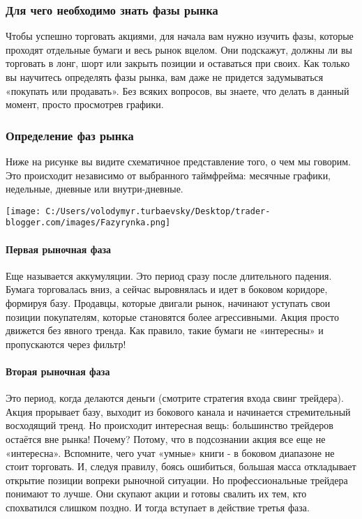 \documentclass[a5paper]{article}
\begin{document}
\subsubsection{Для чего необходимо знать фазы рынка}

Чтобы успешно торговать акциями, для начала вам нужно изучить фазы, которые проходят отдельные бумаги и весь рынок вцелом. Они подскажут, должны ли вы торговать в лонг, шорт или закрыть позиции и оставаться при своих. Как только вы научитесь определять фазы рынка, вам даже не придется задумываться «покупать или продавать». Без всяких вопросов, вы знаете, что делать в данный момент, просто просмотрев графики.

\subsubsection{ Определение фаз рынка}

Ниже на рисунке вы видите схематичное представление того, о чем мы говорим. Это происходит независимо от выбранного таймфрейма: месячные графики, недельные, дневные или внутри-дневные.

\texttt{[image: C:/Users/volodymyr.turbaevsky/Desktop/trader-blogger.com/images/Fazyrynka.png]}

\paragraph{Первая рыночная фаза}

Еще называется аккумуляции. Это период сразу после длительного
падения. Бумага торговалась вниз, а сейчас выровнялась и идет в
боковом коридоре, формируя базу. Продавцы, которые двигали рынок,
начинают уступать свои позиции покупателям, которые становятся более
агрессивными. Акция просто движется без явного тренда. Как правило,
такие бумаги не «интересны»  и пропускаются через фильтр!

\paragraph{Вторая рыночная фаза}

Это период, когда делаются деньги (смотрите стратегия входа свинг
трейдера). Акция прорывает базу, выходит из бокового канала и
начинается стремительный восходящий тренд. Но происходит интересная
вещь: большинство трейдеров остаётся вне рынка! Почему? Потому, что в
подсознании акция все еще не «интересна». Вспомните, чего учат «умные»
книги -  в боковом диапазоне не стоит торговать. И, следуя правилу,
боясь ошибиться, большая масса откладывает открытие позиции вопреки
рыночной ситуации. Но профессиональные трейдера понимают то лучше. Они
скупают акции и готовы свалить их тем, кто спохватился слишком
поздно. И тогда вступает в действие третья фаза.
\end{document}
